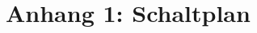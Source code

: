 


\pagestyle{fancy}
\rhead{\thepage} \chead{} 
\cfoot{}


\section*{Anhang 1: Schaltplan} \label{SecAtt1}



\newpage